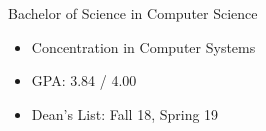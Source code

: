 %
%
%


\begin{projects}
    {Bachelor of Science in Computer Science}
    {
    \begin{itemize}
        \item Concentration in Computer Systems
        \item GPA: 3.84 / 4.00
        \item Dean's List: Fall 18, Spring 19
    \end{itemize}
    }


\end{projects}